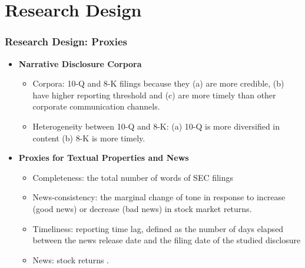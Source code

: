 \documentclass{beamer}
\begin{document}
\section{Research Design}
\begin{frame}
\frametitle{Research Design: Proxies}
\begin{itemize}

\item \textbf{Narrative Disclosure Corpora}

	\begin{itemize}
		\item Corpora: 10-Q and 8-K filings because they (a) are more credible, (b) have higher reporting threshold and (c) are more timely than other corporate communication channels.
		\item Heterogeneity between 10-Q and 8-K: (a) 10-Q is more diversified in content (b) 8-K is more timely.
	\end{itemize}

\item \textbf{Proxies for Textual Properties and News}
	\begin{itemize}
		\item Completeness: the total number of words of SEC filings
		\item News-consistency: the marginal change of tone in response to increase (good news) or decrease (bad news) in stock market returns.
		\item Timeliness: reporting time lag, defined as the number of days elapsed between the news release date and the filing date of the studied disclosure
		\item News: stock returns \citep{basuConservatismPrincipleAsymmetric1997}.
	\end{itemize}

\end{itemize}
\end{frame}
\end{document}
